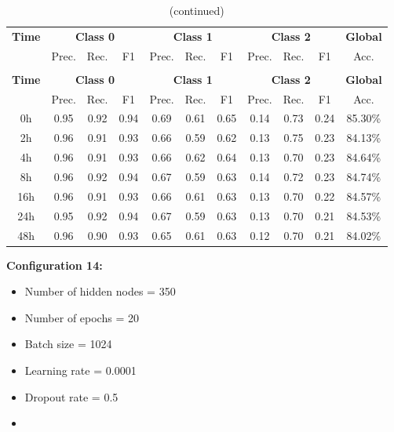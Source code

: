 \documentclass[12pt,oneside]{book} %
\begin{document}
\setlength\LTleft{1cm}
\begin{longtable}{ c ccc ccc ccc c}
\caption{Performance metrics of the LNN model for configuration 13} \\
\toprule
\textbf{Time} & \multicolumn{3}{c}{\textbf{Class 0}} & \multicolumn{3}{c}{\textbf{Class 1}} & \multicolumn{3}{c}{\textbf{Class 2}} & \textbf{Global} \\
               & Prec. & Rec. & F1  & Prec. & Rec. & F1   & Prec. & Rec. & F1  & Acc. \\
\midrule
\endfirsthead

\caption[]{(continued)} \\
\toprule
\textbf{Time} & \multicolumn{3}{c}{\textbf{Class 0}} & \multicolumn{3}{c}{\textbf{Class 1}} & \multicolumn{3}{c}{\textbf{Class 2}} & \textbf{Global} \\
               & Prec. & Rec. & F1  & Prec. & Rec. & F1   & Prec. & Rec. & F1  & Acc. \\
\midrule
\endhead

\bottomrule
\endfoot

\bottomrule
\endlastfoot

0h   & 0.95  & 0.92 & 0.94 & 0.69  & 0.61 & 0.65  & 0.14  & 0.73 & 0.24 & 85.30\% \\
2h   & 0.96  & 0.91 & 0.93 & 0.66  & 0.59 & 0.62  & 0.13  & 0.75 & 0.23 & 84.13\% \\
4h   & 0.96  & 0.91 & 0.93 & 0.66  & 0.62 & 0.64  & 0.13  & 0.70 & 0.23 & 84.64\% \\
8h   & 0.96  & 0.92 & 0.94 & 0.67  & 0.59 & 0.63  & 0.14  & 0.72 & 0.23 & 84.74\% \\
16h  & 0.96  & 0.91 & 0.93 & 0.66  & 0.61 & 0.63  & 0.13  & 0.70 & 0.22 & 84.57\% \\
24h  & 0.95  & 0.92 & 0.94 & 0.67  & 0.59 & 0.63  & 0.13  & 0.70 & 0.21 & 84.53\% \\
48h  & 0.96  & 0.90 & 0.93 & 0.65  & 0.61 & 0.63  & 0.12  & 0.70 & 0.21 & 84.02\% \\
\end{longtable}
\clearpage
\noindent \textbf{Configuration 14:}
\begin{multicols}{2}
    \begin{itemize}
        \item Number of hidden nodes = 350
        \item Number of epochs = 20
        \item Batch size = 1024
    \end{itemize}
    \begin{itemize}
         \item Learning rate = 0.0001
         \item Dropout rate  = 0.5
         \item[\hspace{0pt}]
    \end{itemize}
\end{multicols}
\end{document}
